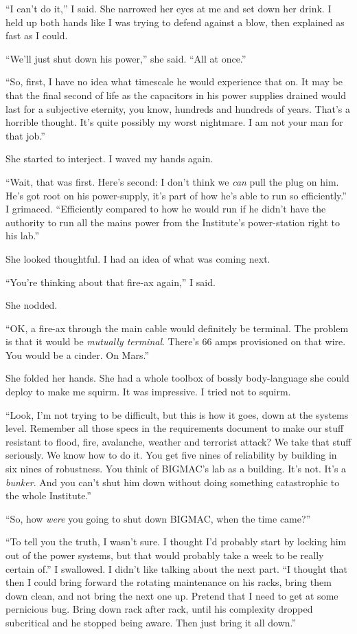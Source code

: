 “I can't do it,” I said. She narrowed her eyes at me and set down 
her drink. I held up both hands like I was trying to defend against a 
blow, then explained as fast as I could.

“We'll just shut down his power,” she said. “All at once.”

“So, first, I have no idea what timescale he would experience that 
on. It may be that the final second of life as the capacitors in his 
power supplies drained would last for a subjective eternity, you know, 
hundreds and hundreds of years. That's a horrible thought. It's quite 
possibly my worst nightmare. I am not your man for that job.”

She started to interject. I waved my hands again.

“Wait, that was first. Here's second: I don't think we \emph{can} 
pull the plug on him. He's got root on his power-supply, it's part of 
how he's able to run so efficiently.” I grimaced. “Efficiently 
compared to how he would run if he didn't have the authority to run all 
the mains power from the Institute's power-station right to his lab.”

She looked thoughtful. I had an idea of what was coming next.

“You're thinking about that fire-ax again,” I said.

She nodded.

“OK, a fire-ax through the main cable would definitely be terminal. 
The problem is that it would be \emph{mutually terminal}. There's 66 
amps provisioned on that wire. You would be a cinder. On Mars.”

She folded her hands. She had a whole toolbox of bossly body-language 
she could deploy to make me squirm. It was impressive. I tried not to 
squirm.

“Look, I'm not trying to be difficult, but this is how it goes, down 
at the systems level. Remember all those specs in the requirements 
document to make our stuff resistant to flood, fire, avalanche, weather 
and terrorist attack? We take that stuff seriously. We know how to do 
it. You get five nines of reliability by building in six nines of 
robustness. You think of BIGMAC's lab as a building. It's not. It's a 
\emph{bunker}. And you can't shut him down without doing something 
catastrophic to the whole Institute.”

“So, how \emph{were} you going to shut down BIGMAC, when the time 
came?”

“To tell you the truth, I wasn't sure. I thought I'd probably start 
by locking him out of the power systems, but that would probably take a 
week to be really certain of.” I swallowed. I didn't like talking 
about the next part. “I thought that then I could bring forward the 
rotating maintenance on his racks, bring them down clean, and not bring 
the next one up. Pretend that I need to get at some pernicious bug. 
Bring down rack after rack, until his complexity dropped subcritical 
and he stopped being aware. Then just bring it all down.”

